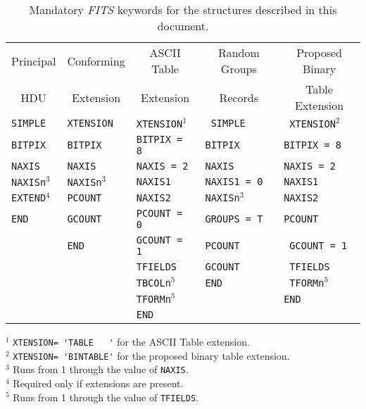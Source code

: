 \begin{table}[htpb]
\begin{center}
 
\begin{tabular}{lllll} \\
\multicolumn{1}{c}{Principal}  & \multicolumn{1}{c}{Conforming}     &
\multicolumn{1}{c}{ASCII Table} & \multicolumn{1}{c}{Random Groups}
&
\multicolumn{1}{c}{Proposed Binary }  \\ 
\multicolumn{1}{c}{HDU}        & \multicolumn{1}{c}{Extension}      &
\multicolumn{1}{c}{Extension}   & \multicolumn{1}{c}{Records}     &
\multicolumn{1}{c}{Table Extension}     \\ \hline
{\tt SIMPLE} & {\tt XTENSION} & {\tt XTENSION}$^{1}$ & {\tt
SIMPLE}     & {\tt
XTENSION}$^{2}$\\
{\tt BITPIX} & {\tt BITPIX}   & {\tt BITPIX = 8}     & {\tt BITPIX}     &
{\tt BITPIX = 8}\\
{\tt NAXIS}  & {\tt NAXIS}    & {\tt NAXIS = 2}      & {\tt NAXIS}      &
{\tt NAXIS = 2}\\
{\tt NAXISn}$^{3}$& {\tt NAXISn}$^{3}$& {\tt NAXIS1} & {\tt NAXIS1 = 0} &
{\tt NAXIS1}\\
{\tt EXTEND}$^{4}$& {\tt PCOUNT} & {\tt NAXIS2}    & {\tt NAXISn}$^{3}$ 
   & {\tt NAXIS2}\\
{\tt END}    & {\tt GCOUNT}   & {\tt PCOUNT = 0}     & {\tt GROUPS = T}  
  & {\tt PCOUNT}\\
             & {\tt END}      & {\tt GCOUNT = 1}     & {\tt PCOUNT}     & {\tt
GCOUNT = 1}\\
             &                & {\tt TFIELDS}        & {\tt GCOUNT}     & {\tt
TFIELDS}\\
             &                & {\tt TBCOLn}$^{5}$   & {\tt END}        & {\tt
TFORMn}$^{5}$\\
             &                & {\tt TFORMn}$^{5}$   &                  & {\tt END}\\
             &                & {\tt END}            &                  &          \\ \hline
\end{tabular}
\end{center}

$^1$  \verb*+XTENSION= 'TABLE   '+ for the ASCII Table 
 extension. \\
$^2$ \verb*+XTENSION= 'BINTABLE'+ for the proposed 
 binary table extension.\\
$^3$ Runs from 1 through the value of {\tt NAXIS}.\\
$^4$ Required only if extensions are present.\\
$^5$ Runs from 1 through the value of {\tt TFIELDS}.

\caption[Mandatory {\em FITS\/} keywords]                                        
         {Mandatory {\em FITS\/} keywords for the 
          structures described in this document.}                              
\end{table}              


